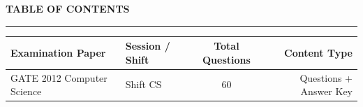 \documentclass[a4paper,10pt,twoside]{article}
\begin{document}
\newpage

\begin{center}
    {\Large\textbf{TABLE OF CONTENTS}}\\[0.4em]
    \rule{0.5\textwidth}{0.6pt}
\end{center}
\vspace{1em}

\noindent\begin{tabularx}{\linewidth}{|X|l|c|r|}
\hline
\textbf{Examination Paper} & \textbf{Session / Shift} & \textbf{Total Questions} & \textbf{Content Type} \\
\hline

GATE 2012 Computer Science & Shift CS & 60 & Questions + Answer Key \\ \hline
\end{tabularx}

\vspace{1.5em}

\newpage
\end{document}
